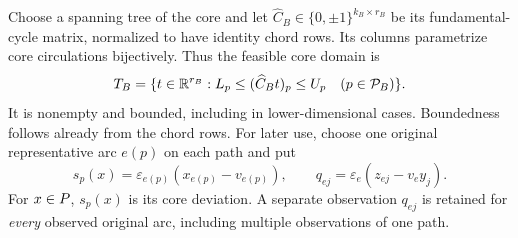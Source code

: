 Choose a spanning tree of the core and let
$\widehat C_B\in\{0,\pm1\}^{k_B\times r_B}$ be its fundamental-cycle
matrix, normalized to have identity chord rows. Its columns parametrize
core circulations bijectively. Thus the feasible core domain is
\begin{equation}\label{eq:core-domain}
 T_B=\{t\in\mathbb R^{r_B}:L_p\le(\widehat C_Bt)_p\le U_p
                         \quad(p\in\mathcal P_B)\}.
\end{equation}
It is nonempty and bounded, including in lower-dimensional cases. Boundedness
follows already from the chord rows. For later use, choose one original
representative arc $e(p)$ on each path and put
\begin{equation}\label{eq:aggregate-path-expression}
 s_p(x)=\varepsilon_{e(p)}(x_{e(p)}-v_{e(p)}),\qquad
 q_{ej}=\varepsilon_e(z_{ej}-v_e y_j).
\end{equation}
For $x\in P$, $s_p(x)$ is its core deviation. A separate observation
$q_{ej}$ is retained for \emph{every} observed original arc, including
multiple observations of one path.

